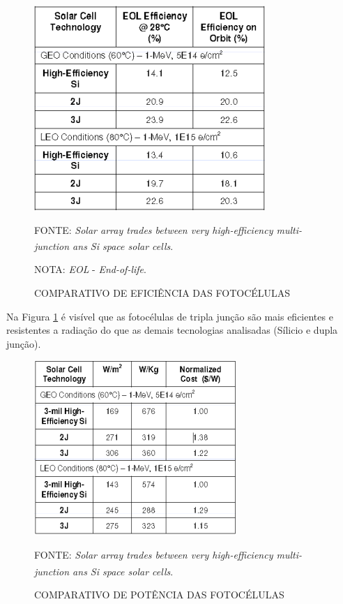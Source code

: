 \documentclass[
	12pt,				%
	openright,			%
	oneside,			%
	a4paper,			%
	english,			%
	french,				%
	spanish,			%
	brazil,				%
	oldfontcommands
	]{abntex2}
\begin{document}
	\begin{figure}[th]
		\caption{COMPARATIVO DE EFICIÊNCIA DAS FOTOCÉLULAS}
		\label{Fig_cell_comp1}
		\centering
		\includegraphics[width=0.55\linewidth]{./figs/cell_comp1}
			
		\begin{small}
			FONTE: \textit{Solar array trades between very high-efficiency multi-junction ans Si space solar cells}.\textsuperscript{\cite{Fatemi}}
		\end{small}
		
		\begin{footnotesize}
			NOTA: \textit{EOL} - \textit{End-of-life}.
		\end{footnotesize}
	\end{figure}
	
	Na Figura \ref{Fig_cell_comp1} é visível que as fotocélulas de tripla junção são mais eficientes e resistentes a radiação do que as demais tecnologias analisadas (Sílicio e dupla junção).
	
	\begin{figure}[th]
		\caption{COMPARATIVO DE POTÊNCIA DAS FOTOCÉLULAS}
		\label{Fig_cell_comp2}
		\centering
		\includegraphics[width=0.6\linewidth]{./figs/cell_comp2}
			
		\begin{small}
			FONTE: \textit{Solar array trades between very high-efficiency multi-junction ans Si space solar cells}.\textsuperscript{\cite{Fatemi}}
		\end{small}
	\end{figure}	
	
\end{document}
